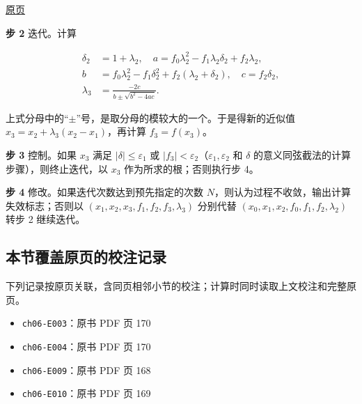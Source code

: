 \documentclass[
  10pt,
  fontset=fandol]{ctexart}
\providecommand{\tightlist}{%
  \setlength{\itemsep}{0pt}\setlength{\parskip}{0pt}}
\begin{document}
\href{../../source-images/pdf-171.jpeg}{原页}

\textbf{步 2} 迭代。计算

\[
\begin{aligned}
\delta_2&=1+\lambda_2,\quad a=f_0\lambda_2^2-f_1\lambda_2\delta_2+f_2\lambda_2,\\
b&=f_0\lambda_2^2-f_1\delta_2^2+f_2(\lambda_2+\delta_2),\quad c=f_2\delta_2,\\
\lambda_3&=\frac{-2c}{b\pm\sqrt{b^2-4ac}}.
\end{aligned}
\]

上式分母中的``\(\pm\)''号，是取分母的模较大的一个。于是得新的近似值 \(x_3=x_2+\lambda_3(x_2-x_1)\)，再计算 \(f_3=f(x_3)\)。

\textbf{步 3} 控制。如果 \(x_3\) 满足 \(|\delta|\leqslant\varepsilon_1\) 或 \(|f_3|<\varepsilon_2\)（\(\varepsilon_1,\varepsilon_2\) 和 \(\delta\) 的意义同弦截法的计算步骤），则终止迭代，以 \(x_3\) 作为所求的根；否则执行步 4。

\textbf{步 4} 修改。如果迭代次数达到预先指定的次数 \(N\)，则认为过程不收敛，输出计算失效标志；否则以 \((x_1,\allowbreak x_2,\allowbreak x_3,\allowbreak f_1,\allowbreak f_2,\allowbreak f_3,\allowbreak \lambda_3)\) 分别代替 \((x_0,\allowbreak x_1,\allowbreak x_2,\allowbreak f_0,\allowbreak f_1,\allowbreak f_2,\allowbreak \lambda_2)\) 转步 2 继续迭代。

\subsection{本节覆盖原页的校注记录}\label{ux672cux8282ux8986ux76d6ux539fux9875ux7684ux6821ux6ce8ux8bb0ux5f55}

下列记录按原页关联，含同页相邻小节的校注；计算时同时读取上文校注和完整原页。

\begin{itemize}
\tightlist
\item
  \texttt{ch06-E003}：原书 PDF 页 170
\item
  \texttt{ch06-E004}：原书 PDF 页 170
\item
  \texttt{ch06-E009}：原书 PDF 页 168
\item
  \texttt{ch06-E010}：原书 PDF 页 169
\end{itemize}
\end{document}
